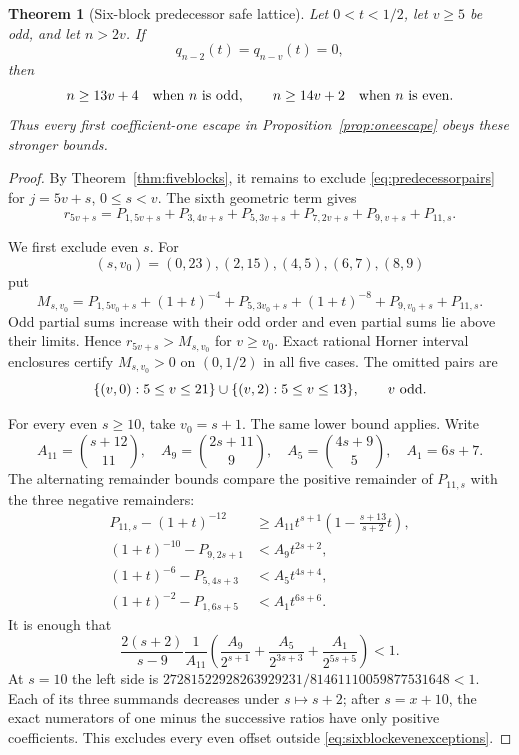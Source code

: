 \documentclass[11pt]{article}
\newtheorem{theorem}{Theorem}[section]
\theoremstyle{remark}
\numberwithin{equation}{section}
\begin{document}
\begin{theorem}[Six-block predecessor safe lattice]\label{thm:sixblocks}
Let $0<t<1/2$, let $v\ge5$ be odd, and let $n>2v$.  If
\[
 q_{n-2}(t)=q_{n-v}(t)=0,
\]
then
\[
 n\ge13v+4\quad\hbox{when $n$ is odd},\qquad
 n\ge14v+2\quad\hbox{when $n$ is even}.
\]
Thus every first coefficient-one escape in Proposition~\ref{prop:oneescape}
obeys these stronger bounds.
\end{theorem}
\begin{proof}
By Theorem~\ref{thm:fiveblocks}, it remains to exclude
\eqref{eq:predecessorpairs} for $j=5v+s$, $0\le s<v$.  The sixth geometric
term gives
\begin{equation}\label{eq:sixblock}
 r_{5v+s}=P_{1,5v+s}+P_{3,4v+s}+P_{5,3v+s}
             +P_{7,2v+s}+P_{9,v+s}+P_{11,s}.
\end{equation}

We first exclude even $s$.  For
\[
 (s,v_0)=(0,23),(2,15),(4,5),(6,7),(8,9)
\]
put
\[
 M_{s,v_0}=P_{1,5v_0+s}+(1+t)^{-4}+P_{5,3v_0+s}
 +(1+t)^{-8}+P_{9,v_0+s}+P_{11,s}.
\]
Odd partial sums increase with their odd order and even partial sums lie above
their limits.  Hence $r_{5v+s}>M_{s,v_0}$ for $v\ge v_0$.  Exact rational
Horner interval enclosures certify $M_{s,v_0}>0$ on $(0,1/2)$ in all five
cases.  The omitted pairs are
\begin{equation}\label{eq:sixblockevenexceptions}
 \{(v,0):5\le v\le21\}\cup\{(v,2):5\le v\le13\},
 \qquad v\ \hbox{odd}.
\end{equation}

For every even $s\ge10$, take $v_0=s+1$.  The same lower bound applies.
Write
\[
 A_{11}={s+12\choose11},\quad A_9={2s+11\choose9},\quad
 A_5={4s+9\choose5},\quad A_1=6s+7.
\]
The alternating remainder bounds compare the positive remainder of
$P_{11,s}$ with the three negative remainders:
\begin{align*}
 P_{11,s}-(1+t)^{-12}
 &\ge A_{11}t^{s+1}\left(1-\frac{s+13}{s+2}t\right),\\
 (1+t)^{-10}-P_{9,2s+1}&<A_9t^{2s+2},\\
 (1+t)^{-6}-P_{5,4s+3}&<A_5t^{4s+4},\\
 (1+t)^{-2}-P_{1,6s+5}&<A_1t^{6s+6}.
\end{align*}
It is enough that
\[
 \frac{2(s+2)}{s-9}\frac1{A_{11}}
 \left(\frac{A_9}{2^{s+1}}+\frac{A_5}{2^{3s+3}}
                         +\frac{A_1}{2^{5s+5}}\right)<1.
\]
At $s=10$ the left side is
$27281522928263929231/81461110059877531648<1$.  Each of its three
summands decreases under $s\mapsto s+2$; after $s=x+10$, the exact
numerators of one minus the successive ratios have only positive
coefficients.  This excludes every even offset outside
\eqref{eq:sixblockevenexceptions}.


\end{proof}
\end{document}
